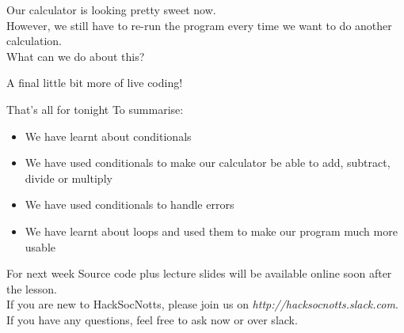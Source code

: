 \documentclass{beamer}
\begin{document}
\begin{frame}

Our calculator is looking pretty sweet now.\\
\pause
However, we still have to re-run the program every time we want to do another calculation.\\ \pause What can we do about this?
\end{frame}

\begin{frame}
A final little bit more of live coding!
\end{frame}


\begin{frame}{That's all for tonight}
  To summarise:
  \begin{itemize}
  \item We have learnt about conditionals
  \item We have used conditionals to make our calculator be able to add, subtract, divide or multiply
  \item We have used conditionals to handle errors
  \item We have learnt about loops and used them to make our program much more usable
  \end{itemize}
\end{frame}

\begin{frame}{For next week}
Source code plus lecture slides will be available online soon after the lesson.\\
If you are new to HackSocNotts, please join us on \textit{http://hacksocnotts.slack.com}.\\
If you have any questions, feel free to ask now or over slack.\\
\end{frame}
\end{document}
